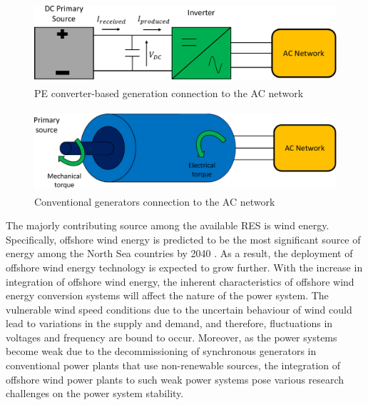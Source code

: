 \begin{figure}[H]
\centering
    \includegraphics[height = 3cm,width = 12cm]{Diagrams/Chapter_1/Energy_conv_system_2.pdf}
    \caption{PE converter-based generation connection to the AC network \cite{denis_migrate_2018}}
    \label{fig:Energy_conv_system_2}
\end{figure}
\vspace{0mm}
\begin{figure}[H]
\centering
    \includegraphics[height = 3cm,width = 12.5cm]{Diagrams/Chapter_1/Energy_conv_system.pdf}
    \caption{Conventional generators connection to the AC network \cite{denis_migrate_2018}}
    \label{fig:Energy_conv_system}
\end{figure}

The majorly contributing source among the available \gls{RES} is wind energy. Specifically, offshore wind energy is predicted to be the most significant source of energy among the North Sea countries by 2040 \cite{muller2017translate}. As a result, the deployment of offshore wind energy technology is expected to grow further. With the increase in integration of offshore wind energy, the inherent characteristics of offshore wind energy conversion systems will affect the nature of the power system. The vulnerable wind speed conditions due to the uncertain behaviour of wind could lead to variations in the supply and demand, and therefore, fluctuations in voltages and frequency are bound to occur. Moreover, as the power systems become weak due to the decommissioning of synchronous generators in conventional power plants that use non-renewable sources, the integration of offshore wind power plants to such weak power systems pose various research challenges on the power system stability. 


